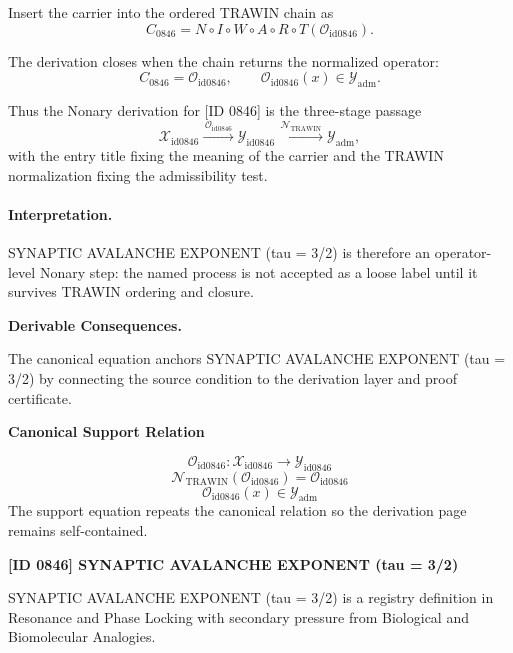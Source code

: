 Insert the carrier into the ordered TRAWIN chain as\[
C_{0846}=N\circ I\circ W\circ A\circ R\circ T(\mathcal{O}_{\mathrm{id0846}}).
\]

The derivation closes when the chain returns the normalized operator:\[
C_{0846}=\mathcal{O}_{\mathrm{id0846}},\qquad \mathcal{O}_{\mathrm{id0846}}(x)\in\mathcal{Y}_{\mathrm{adm}}.
\]

Thus the Nonary derivation for [ID 0846] is the three-stage passage
\[
\mathcal{X}_{\mathrm{id0846}}\xrightarrow{\,\mathcal{O}_{\mathrm{id0846}}\,} \mathcal{Y}_{\mathrm{id0846}}\xrightarrow{\,\mathcal{N}_{\mathrm{TRAWIN}}\,} \mathcal{Y}_{\mathrm{adm}},
\]
with the entry title fixing the meaning of the carrier and the TRAWIN normalization fixing the admissibility test.

\paragraph{Interpretation.} SYNAPTIC AVALANCHE EXPONENT (tau = 3/2) is therefore an operator-level Nonary step: the named process is not accepted as a loose label until it survives TRAWIN ordering and closure.

\par\vspace{0.35em}
\noindent\textbf{Derivable Consequences.}\quad
\begingroup
\footnotesize
\raggedright
The canonical equation anchors SYNAPTIC AVALANCHE EXPONENT (tau = 3/2) by connecting the source condition to the derivation layer and proof certificate.
\par\endgroup

\noindent\textbf{Canonical Support Relation}\par
\[
\mathcal{O}_{\mathrm{id0846}}:\mathcal{X}_{\mathrm{id0846}}\longrightarrow\mathcal{Y}_{\mathrm{id0846}}
\]
\[
\mathcal{N}_{\mathrm{TRAWIN}}(\mathcal{O}_{\mathrm{id0846}})=\mathcal{O}_{\mathrm{id0846}}
\]
\[
\mathcal{O}_{\mathrm{id0846}}(x)\in\mathcal{Y}_{\mathrm{adm}}
\]
\noindent The support equation repeats the canonical relation so the derivation page remains self-contained.\par

\clearpage
\noindent\textbf{[ID 0846] SYNAPTIC AVALANCHE EXPONENT (tau = 3/2)}\par
\vspace{0.35em}
\begingroup\small
{}
SYNAPTIC AVALANCHE EXPONENT (tau = 3/2) is a registry definition in Resonance and Phase Locking with secondary pressure from Biological and Biomolecular Analogies.

